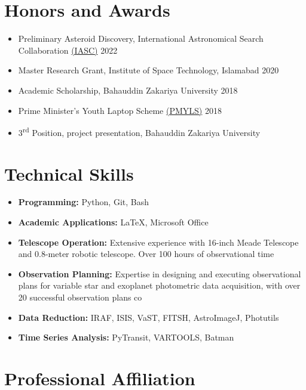 \documentclass{article}
\begin{document}
\section*{Honors and Awards }
\vspace{-\baselineskip}
\noindent\makebox[\linewidth]{\rule{\textwidth}{0.4pt}}
\begin{itemize}
    \item Preliminary Asteroid Discovery, International Astronomical Search Collaboration \href{http://iasc.cosmosearch.org/}{(IASC)} \hfill 2022 
    \item Master Research Grant, Institute of Space Technology, Islamabad \hfill 2020 
    \item Academic Scholarship, Bahauddin Zakariya University \hfill 2018 
    \item Prime Minister's Youth Laptop Scheme \href{https://laptop.pmyp.gov.pk/index.php}{(PMYLS)} \hfill 2018 
    \item 3\textsuperscript{rd} Position, project presentation, Bahauddin Zakariya University \end{itemize}

\section*{Technical Skills}
\vspace{-\baselineskip}
\noindent\makebox[\linewidth]{\rule{\textwidth}{0.4pt}}
\begin{itemize}
    \item \textbf{Programming:} Python, Git, Bash
    \item \textbf{Academic Applications:} LaTeX, Microsoft Office
    \item \textbf{Telescope Operation:} Extensive experience with 16-inch Meade Telescope and 0.8-meter robotic telescope. Over 100 hours of observational time
    \item \textbf{Observation Planning:} Expertise in designing and executing observational plans for variable star and exoplanet photometric data acquisition, with over 20 successful observation plans co
    \item \textbf{Data Reduction:}  IRAF, ISIS, VaST, FITSH, AstroImageJ, Photutils
    \item \textbf{Time Series Analysis:} PyTransit, VARTOOLS, Batman
\end{itemize}

\section*{Professional Affiliation}
\vspace{-\baselineskip}
\noindent\makebox[\linewidth]{\rule{\textwidth}{0.4pt}}
\begin{itemize}
    \item \textbf{American Association of Variable star Observers} 
 \href{https://www.aavso.org/users/jiqbal}{(AAVSO)}} \hfill 2023 - Present \\ Member
\end{itemize}
\end{document}
